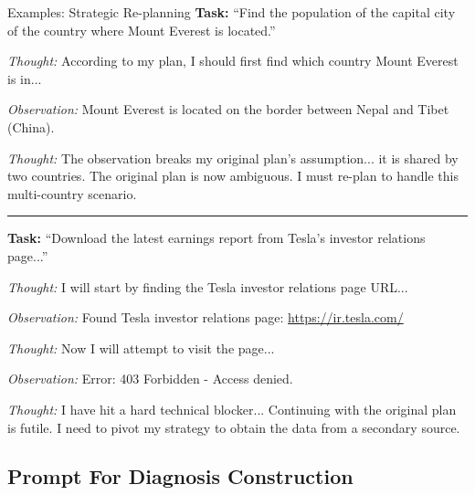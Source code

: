 \begin{ExampleBox}{Examples: Strategic Re-planning}
\textbf{Task:} ``Find the population of the capital city of the country where Mount Everest is located.''

\smallskip
\textit{Thought:} According to my plan, I should first find which country Mount Everest is in...

\textit{Observation:} Mount Everest is located on the border between Nepal and Tibet (China).

\smallskip
\textit{Thought:} The observation breaks my original plan's assumption... it is shared by two countries. The original plan is now ambiguous. I must re-plan to handle this multi-country scenario.

\vfill
\hrule
\vspace{10pt}

\textbf{Task:} ``Download the latest earnings report from Tesla's investor relations page...''

\smallskip
\textit{Thought:} I will start by finding the Tesla investor relations page URL...

\textit{Observation:} Found Tesla investor relations page: \url{https://ir.tesla.com/}

\smallskip
\textit{Thought:} Now I will attempt to visit the page...

\textit{Observation:} Error: 403 Forbidden - Access denied.

\smallskip
\textit{Thought:} I have hit a hard technical blocker... Continuing with the original plan is futile. I need to pivot my strategy to obtain the data from a secondary source.
\end{ExampleBox}


\subsection{Prompt For Diagnosis Construction}



